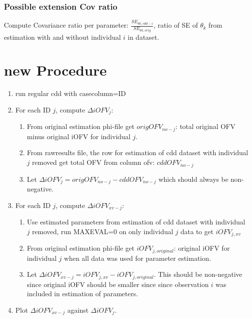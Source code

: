 \documentclass[a4wide,12pt]{article}
\renewcommand{\_}{\textscale{.7}{\textunderscore}}
\begin{document}
\subsubsection*{Possible extension Cov ratio}
Compute Covariance ratio per parameter: 
$\frac{SE_{\theta k,cdd-i}}{SE_{\theta k,orig}}$, 
ratio of SE of $\theta_k$ from estimation with and without individual $i$
in dataset.

\section{new Procedure }
\begin{enumerate}
\item run regular cdd with case\_column=ID
\item For each ID $j$, compute $\Delta iOFV_{j}$:  
\begin{enumerate}
\item From original estimation
  phi-file get $origOFV_{no-j}$: total original OFV minus original iOFV
  for individual $j$.
\item From raw\_results file, the row for
  estimation of cdd dataset with individual $j$ removed get total OFV
  from column ofv: $cddOFV_{no-j}$
\item Let $\Delta iOFV_{j} = origOFV_{no-j} - cddOFV_{no-j}$ which should
  always be non-negative.
\end{enumerate}
\item For each ID $j$, compute $\Delta iOFV_{xv-j}$:  
\begin{enumerate}
\item Use estimated parameters from estimation of cdd dataset with
  individual $j$ removed, run MAXEVAL=0 on only individual $j$ data to
  get $iOFV_{j,xv}$
\item From original estimation
  phi-file get $iOFV_{j,original}$: original iOFV for individual $j$
  when all data was used for parameter estimation.
\item Let $\Delta iOFV_{xv-j} = iOFV_{j,xv}-iOFV_{j,original}$. This
  should be non-negative since original iOFV should be smaller since
  since observation $i$
  was included in estimation of parameters.
\end{enumerate}
\item Plot $\Delta iOFV_{xv-j}$ against $\Delta iOFV_{j}$.
\end{enumerate}
\end{document}
